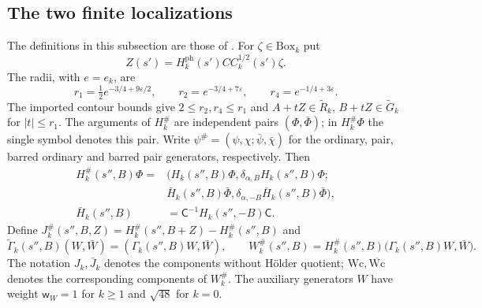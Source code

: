 \subsection{The two finite localizations}
The definitions in this subsection are those of
\cite[\S5]{NonlinearStep}. For $\zeta\in\mathrm{Box}_k$ put
\begin{equation}\label{eq:rgnl-weakened-photon}
 Z(s')=H_k^{\mathrm{ph}}(s')C C_k^{1/2}(s')\zeta.
\end{equation}
The radii, with $e=e_k$, are
\begin{equation}\label{eq:rgnl-contour-radii}
 r_1=\tfrac12e^{-3/4+9\varepsilon/2},\qquad
 r_2=e^{-3/4+7\varepsilon},\qquad r_4=e^{-1/4+3\varepsilon}.
\end{equation}
The imported contour bounds give $2\le r_2,r_4\le r_1$ and
$A+tZ\in\widetilde R_k$, $B+tZ\in\widetilde G_k$ for $|t|\le r_1$.
The arguments of $H_k^\#$ are independent pairs
$(\Phi,\bar\Phi)$; in $H_k^\#\Phi$ the single symbol denotes
this pair. Write
$\psi^\#=(\psi,\chi;\bar\psi,\bar\chi)$ for the ordinary,
pair, barred ordinary and barred pair generators, respectively.
Then
\[
 \begin{aligned}
 H_k^\#(s'',B)\Phi
   ={}&(H_k(s'',B)\Phi,\delta_{\alpha,B}H_k(s'',B)\Phi;\\
       &
       \bar H_k(s'',B)\bar\Phi,
                       \delta_{\alpha,-B}\bar H_k(s'',B)\bar\Phi),\\
 \bar H_k(s'',B)&=\mathsf C^{-1}H_k(s'',-B)\mathsf C.
 \end{aligned}
\]
Define
$J_k^\#(s'',B,Z)=H_k^\#(s'',B+Z)-H_k^\#(s'',B)$ and
\[
 \widetilde\Gamma_k(s'',B)(W,\bar W)
                         =(\Gamma_k(s'',B)W,\bar W),\qquad
 W_k^\#(s'',B)=H_k^\#(s'',B)
                         \big(\Gamma_k(s'',B)W,\bar W\big).
\]
The notation $J_k,\bar J_k$ denotes the components without
H\"older quotient; $\mathrm{Wc},\overline{\mathrm{Wc}}$ denotes
the corresponding components of $W_k^\#$.
The auxiliary generators $W$ have weight
$\mathsf w_W=1$ for $k\ge1$ and $\sqrt{48}$ for $k=0$.

